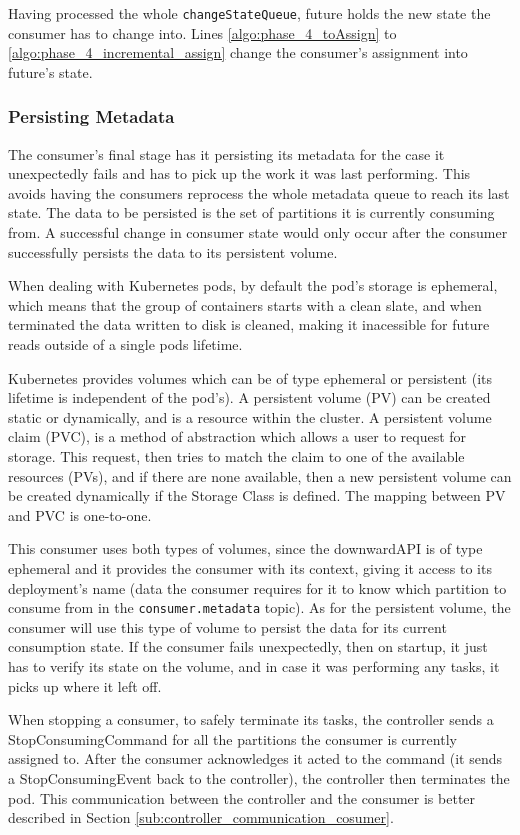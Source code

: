 Having processed the whole \lstinline{changeStateQueue}, future holds the new
state the consumer has to change into. Lines \ref{algo:phase_4_toAssign} to
\ref{algo:phase_4_incremental_assign} change the consumer's assignment into
future's state.

\subsubsection{Persisting Metadata}

The consumer's final stage has it persisting its metadata for the case it
unexpectedly fails and has to pick up the work it was last performing. This
avoids having the consumers reprocess the whole metadata queue to reach its last
state. The data to be persisted is the set of partitions it is currently
consuming from. A successful change in consumer state would only occur after the
consumer successfully persists the data to its persistent volume.

When dealing with Kubernetes pods, by default the pod's storage is ephemeral,
which means that the group of containers starts with a clean slate, and when
terminated the data written to disk is cleaned, making it inacessible for future
reads outside of a single pods lifetime.

Kubernetes provides volumes which can be of type ephemeral or persistent (its
lifetime is independent of the pod's). A persistent volume (PV) can be created
static or dynamically, and is a resource within the cluster. A persistent volume
claim (PVC), is a method of abstraction which allows a user to request for
storage. This request, then tries to match the claim to one of the available
resources (PVs), and if there are none available, then a new persistent volume can be
created dynamically if the Storage Class is defined. The mapping between PV and
PVC is one-to-one.

This consumer uses both types of volumes, since the downwardAPI is of type
ephemeral and it provides the consumer with its context, giving it access to its
deployment's name (data the consumer requires for it to know which partition to
consume from in the \lstinline{consumer.metadata} topic).  As for the persistent
volume, the consumer will use this type of volume to persist the data for its
current consumption state. If the consumer fails unexpectedly, then on startup,
it just has to verify its state on the volume, and in case it was performing any
tasks, it picks up where it left off.

When stopping a consumer, to safely terminate its tasks, the controller sends a
StopConsumingCommand for all the partitions the consumer is currently assigned
to. After the consumer acknowledges it acted to the command (it sends a
StopConsumingEvent back to the controller), the controller then terminates the
pod. This communication between the controller and the consumer is better
described in Section \ref{sub:controller_communication_cosumer}. 

